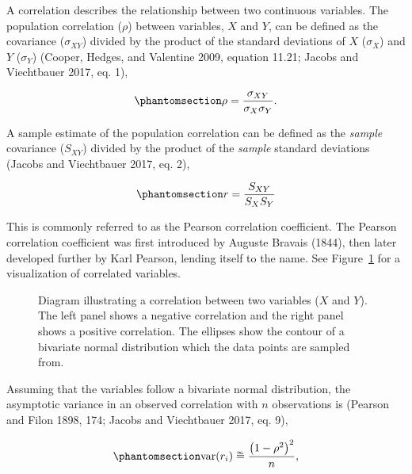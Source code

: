 \documentclass[
  letterpaper,
  DIV=11,
  numbers=noendperiod]{scrreprt}
\begin{document}
A correlation describes the relationship between two continuous
variables. The population correlation (\(\rho\)) between variables,
\(X\) and \(Y\), can be defined as the covariance (\(\sigma_{XY}\))
divided by the product of the standard deviations of \(X\)
(\(\sigma_{X}\)) and \(Y\) (\(\sigma_{Y}\)) (Cooper, Hedges, and
Valentine 2009, equation 11.21; Jacobs and Viechtbauer 2017, eq. 1),

\begin{equation}\phantomsection\label{eq-pop-r}{
\rho = \frac{\sigma_{XY}}{\sigma_{X}\sigma_{Y}}.
}\end{equation}

A sample estimate of the population correlation can be defined as the
\emph{sample} covariance (\(S_{XY}\)) divided by the product of the
\emph{sample} standard deviations (Jacobs and Viechtbauer 2017, eq. 2),

\begin{equation}\phantomsection\label{eq-sam-r}{
r = \frac{S_{XY}}{S_XS_Y}
}\end{equation}

This is commonly referred to as the Pearson correlation coefficient. The
Pearson correlation coefficient was first introduced by Auguste Bravais
(1844), then later developed further by Karl Pearson, lending itself to
the name. See Figure~\ref{fig-r} for a visualization of correlated
variables.

\begin{figure}[H]


\caption{\label{fig-r}Diagram illustrating a correlation between two
variables (\(X\) and \(Y\)). The left panel shows a negative correlation
and the right panel shows a positive correlation. The ellipses show the
contour of a bivariate normal distribution which the data points are
sampled from.}

\end{figure}%

Assuming that the variables follow a bivariate normal distribution, the
asymptotic variance in an observed correlation with \(n\) observations
is (Pearson and Filon 1898, 174; Jacobs and Viechtbauer 2017, eq. 9),

\begin{equation}\phantomsection\label{eq-asymp-var-r}{
\text{var}(r_i) \overset{_\infty}{=} \frac{\left(1 - \rho^2\right)^2}{n},
}\end{equation}
\end{document}
